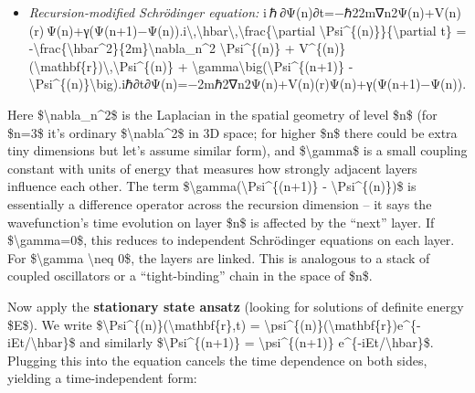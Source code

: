 \documentclass[
]{article}
\begin{document}
\begin{itemize}
\item
  \emph{Recursion-modified Schrödinger equation:}
  i ℏ ∂Ψ(n)∂t=−ℏ22m∇n2Ψ(n)+V(n)(r) Ψ(n)+γ(Ψ(n+1)−Ψ(n)).i\textbackslash,\textbackslash hbar\textbackslash,\textbackslash frac\{\textbackslash partial
  \textbackslash Psi\^{}\{(n)\}\}\{\textbackslash partial t\} =
  -\textbackslash frac\{\textbackslash hbar\^{}2\}\{2m\}\textbackslash nabla\_n\^{}2
  \textbackslash Psi\^{}\{(n)\} +
  V\^{}\{(n)\}(\textbackslash mathbf\{r\})\textbackslash,\textbackslash Psi\^{}\{(n)\}
  +
  \textbackslash gamma\textbackslash big(\textbackslash Psi\^{}\{(n+1)\}
  -
  \textbackslash Psi\^{}\{(n)\}\textbackslash big).iℏ∂t∂Ψ(n)\hspace{0pt}=−2mℏ2\hspace{0pt}∇n2\hspace{0pt}Ψ(n)+V(n)(r)Ψ(n)+γ(Ψ(n+1)−Ψ(n)).
\end{itemize}

Here \$\textbackslash nabla\_n\^{}2\$ is the Laplacian in the spatial
geometry of level \$n\$ (for \$n=3\$ it's ordinary
\$\textbackslash nabla\^{}2\$ in 3D space; for higher \$n\$ there could
be extra tiny dimensions but let's assume similar form), and
\$\textbackslash gamma\$ is a small coupling constant with units of
energy that measures how strongly adjacent layers influence each
other\hspace{0pt}. The term
\$\textbackslash gamma(\textbackslash Psi\^{}\{(n+1)\} -
\textbackslash Psi\^{}\{(n)\})\$ is essentially a difference operator
across the recursion dimension -- it says the wavefunction's time
evolution on layer \$n\$ is affected by the ``next'' layer. If
\$\textbackslash gamma=0\$, this reduces to independent Schrödinger
equations on each layer. For \$\textbackslash gamma \textbackslash neq
0\$, the layers are linked. This is analogous to a stack of coupled
oscillators or a ``tight-binding'' chain in the space of
\$n\$\hspace{0pt}.

Now apply the \textbf{stationary state ansatz} (looking for solutions of
definite energy \$E\$). We write
\$\textbackslash Psi\^{}\{(n)\}(\textbackslash mathbf\{r\},t) =
\textbackslash psi\^{}\{(n)\}(\textbackslash mathbf\{r\})e\^{}\{-iEt/\textbackslash hbar\}\$
and similarly \$\textbackslash Psi\^{}\{(n+1)\} =
\textbackslash psi\^{}\{(n+1)\}
e\^{}\{-iEt/\textbackslash hbar\}\$\hspace{0pt}. Plugging this into the
equation cancels the time dependence on both sides, yielding a
time-independent form:
\end{document}
